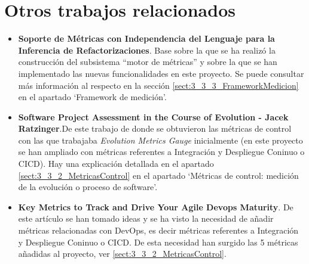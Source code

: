 \section{Otros trabajos relacionados}
\begin{itemize}
	\item \textbf{Soporte de Métricas con Independencia del Lenguaje para la Inferencia de Refactorizaciones}. Base sobre la que se ha realizó la construcción del subsistema ``motor de métricas'' y sobre la que se han implementado las nuevas funcionalidades en este proyecto. Se puede consultar más información al respecto en la sección \ref{sect:3_3_3_FrameworkMedicion} en el apartado `Framework de medición'.
	
	\item \textbf{Software Project Assessment in the Course of Evolution -  Jacek Ratzinger}.De este trabajo de donde se obtuvieron las métricas de control con las que trabajaba \textit{Evolution Metrics Gauge} inicialmente (en este proyecto se han ampliado con métricas referentes a Integración y Despliegue Coninuo o CICD). Hay una explicación detallada en el apartado \ref{sect:3_3_2_MetricasControl} en el apartado `Métricas de control: medición de la evolución o proceso de software'.

	\item \textbf{Key Metrics to Track and Drive Your Agile Devops Maturity}\cite{KeyDevOpsMetrics}. De este artículo se han tomado ideas y se ha visto la necesidad de añadir métricas relacionadas con DevOps, es decir métricas referentes a Integración y Despliegue Coninuo o CICD. De esta necesidad han surgido las 5 métricas añadidas al proyecto, ver \ref{sect:3_3_2_MetricasControl}.
\end{itemize}